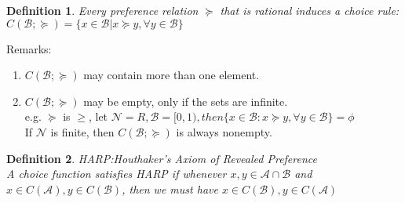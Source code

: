 \documentclass[11pt]{article}
\newtheorem{definition}{Definition}
\newtheorem{proposition}{Proposition}
\begin{document}
\begin{definition}
Every preference relation $\succeq$ that is rational induces a choice rule: $C(\mathcal{B};\succeq)=\{x\in \mathcal{B}|x\succeq y, \forall y \in \mathcal{B}\}$
\end{definition}
Remarks:
\begin{enumerate}
\item $C(\mathcal{B};\succeq)$ may contain more than one element.
\item $C(\mathcal{B};\succeq)$ may be empty, only if the sets are infinite.\\
e.g. $\succeq$ is $\geq$, let $\mathcal{N}=R, \mathcal{B}=[0,1), then \{x \in \mathcal{B}:x\succeq y, \forall y \in \mathcal{B} \}=\phi$\\
If $\mathcal{N}$ is finite, then $C(\mathcal{B};\succeq)$ is always nonempty.
\end{enumerate}
\begin{definition}
HARP:Houthaker's Axiom of Revealed Preference\\
A choice function satisfies HARP if whenever $x,y \in \mathcal{A}\cap \mathcal{B}$ and $x\in C(\mathcal{A}), y \in C(\mathcal{B})$, then we must have $x\in C(\mathcal{B}), y \in C(\mathcal{A})$
\end{definition}

\end{document}

